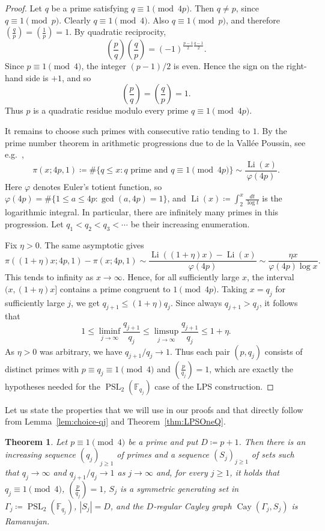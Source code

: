 \documentclass[10pt]{article}
\numberwithin{equation}{section}
\newtheorem{theorem}{Theorem}[section]
\DeclareMathOperator{\PSL}{PSL}
\DeclareMathOperator{\Cay}{Cay}
\begin{document}
\begin{proof}
Let $q$ be a prime satisfying $q\equiv 1 \pmod {4p}$. Then $q\ne p$, since $q\equiv1\pmod p$. Clearly $q\equiv 1\pmod 4$. Also $q\equiv 1\pmod p$, and therefore $\left(\frac{q}{p}\right)=\left(\frac{1}{p}\right)=1$. By quadratic reciprocity,
\[
        \left(\frac{p}{q}\right)\left(\frac{q}{p}\right) = (-1)^{\frac{p-1}{2}\frac{q-1}{2}}.
\]
Since $p\equiv 1\pmod 4$, the integer $(p-1)/2$ is even. Hence the sign on the right-hand side is $+1$, and so
\[
        \left(\frac{p}{q}\right)=\left(\frac{q}{p}\right)=1.
\]
Thus $p$ is a quadratic residue modulo every prime $q\equiv 1\pmod {4p}$.

It remains to choose such primes with consecutive ratio tending to $1$. By the prime number theorem in arithmetic progressions due to de la Vall\'ee Poussin, see e.g.~\cite[Chapter~20]{Davenport2000},
\[
        \pi(x;4p,1) \coloneqq \#\{q\le x\colon q\text{ prime and }q\equiv 1\pmod {4p}\} \sim \frac{\operatorname{Li}(x)}{\varphi(4p)}.
\]
Here $\varphi$ denotes Euler's totient function, so $\varphi(4p)=\#\{1\le a\le 4p\colon\gcd(a,4p)=1\}$, and $\operatorname{Li}(x)\coloneqq \int_2^x \frac{dt}{\log t}$ is the logarithmic integral. In particular, there are infinitely many primes in this progression. Let $q_1<q_2<q_3<\cdots$ be their increasing enumeration.

Fix $\eta>0$. The same asymptotic gives
\[
        \pi((1+\eta)x;4p,1)-\pi(x;4p,1) \sim \frac{\operatorname{Li}((1+\eta)x)-\operatorname{Li}(x)} {\varphi(4p)} \sim \frac{\eta x}{\varphi(4p)\log x}.
\]
This tends to infinity as $x\to\infty$. Hence, for all sufficiently large $x$, the interval $(x,(1+\eta)x]$ contains a prime congruent to $1\pmod {4p}$. Taking $x=q_j$ for sufficiently large $j$, we get $q_{j+1}\le (1+\eta)q_j$. Since always $q_{j+1}>q_j$, it follows that
\[
        1\le \liminf_{j\to\infty}\frac{q_{j+1}}{q_j} \le \limsup_{j\to\infty}\frac{q_{j+1}}{q_j} \le 1+\eta.
\]
As $\eta>0$ was arbitrary, we have ${q_{j+1}}/{q_j}\to 1$. Thus each pair $(p,q_j)$ consists of distinct primes with $p\equiv q_j\equiv1\pmod4$ and $\left(\frac{p}{q_j}\right)=1$, which are exactly the hypotheses needed for the $\PSL_2(\mathbb F_{q_j})$ case of the LPS construction.
\end{proof}


Let us state the properties that we will use in our proofs and that directly follow from Lemma~\ref{lem:choice-qj} and Theorem~\ref{thm:LPSOneQ}.

\begin{theorem}\label{thm:LPS} Let $p\equiv 1\pmod 4$ be a prime and put $D \coloneqq p+1$. Then there is an increasing sequence $(q_j)_{j\ge 1}$ of primes and a sequence $(S_j)_{j\ge 1}$ of sets such that  $q_j\to\infty$ and $q_{j+1}/q_j\to 1$ as $j\to\infty$ and, for every $j\ge 1$, it holds that
$q_j\equiv 1\pmod 4$, $\left(\frac{p}{q_j}\right)=1$, $S_j$ is a  symmetric generating set in $\Gamma_j\coloneqq \PSL_2(\mathbb F_{q_j})$, $|S_j|=D$, and the $D$-regular Cayley graph $\Cay(\Gamma_j,S_j)$ is Ramanujan.
\end{theorem}
\end{document}
